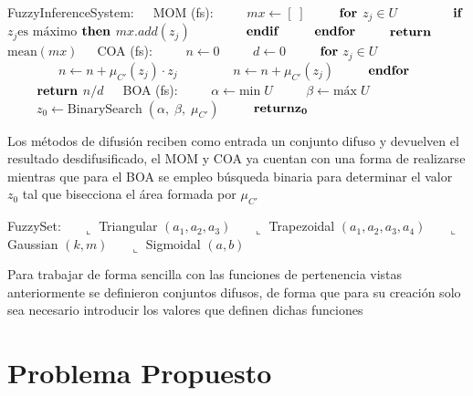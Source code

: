 \documentclass[a4paper,10pt,twocolumn]{article}
\begin{document}
\begin{algorithm}
	\begin{algorithmic}
		\STATE FuzzyInferenceSystem:
		\STATE $ \;\;\;$ MOM (fs):
		\STATE $ \qquad\; mx \leftarrow [\;]$ 
		\STATE $ \qquad\; \bf{for}$ $z_j \in U $
		\STATE $ \qquad\qquad \bf{if}$ $z_j \text{es m\'aximo}$ $\bf{then}$ $ mx.add(z_j)$
		\STATE $ \qquad\qquad \bf{endif}$
		\STATE $ \qquad\; \bf{endfor}$ 
		\STATE $ \qquad\; \bf{return}$ $\text{mean} (mx)$
		\STATE
		\STATE $ \;\;\;$ COA (fs):
		\STATE $ \qquad\; n \leftarrow 0$ 
		\STATE $ \qquad\; d \leftarrow 0$
		\STATE $ \qquad\; \bf{for}$ $z_j \in U $
		\STATE $ \qquad\qquad n \leftarrow n + \mu_{C'} (z_j) \cdot z_j$
		\STATE $ \qquad\qquad n \leftarrow n + \mu_{C'} (z_j)$
		\STATE $ \qquad\; \bf{endfor}$ 
		\STATE $ \qquad\; \bf{return}$ $ n / d$
		\STATE
		\STATE $ \;\;\;$ BOA (fs):
		\STATE $ \qquad\; \alpha \leftarrow \text{min} \;U$ 
		\STATE $ \qquad\; \beta \leftarrow \text{m\'ax} \;U$
		\STATE $ \qquad\; z_0 \leftarrow \text{BinarySearch} \;(\alpha,\; \beta,\; \mu_{C'})$
		\STATE $ \qquad\; \bf{return} z_0$
	\end{algorithmic}
\end{algorithm}

Los m\'etodos de difusi\'on reciben como entrada un conjunto difuso y devuelven el resultado desdifusificado, el MOM y COA ya cuentan con una forma de realizarse mientras que para el BOA se empleo b\'usqueda binaria para determinar el valor $z_0$ tal que bisecciona el \'area formada por $\mu_{C'}$

\begin{algorithm}
	\begin{algorithmic}
		\STATE FuzzySet:
		\STATE $\quad$ $\llcorner$ Triangular $(a_1, a_2, a_3)$
		\STATE $\quad$ $\llcorner$ Trapezoidal $(a_1, a_2, a_3, a_4)$
		\STATE $\quad$ $\llcorner$ Gaussian $(k, m)$
		\STATE $\quad$ $\llcorner$ Sigmoidal $(a, b)$
	\end{algorithmic}
\end{algorithm}

Para trabajar de forma sencilla con las funciones de pertenencia vistas anteriormente se definieron conjuntos difusos, de forma que para su creaci\'on solo sea necesario introducir los valores que definen dichas funciones 

\section*{Problema Propuesto}\label{sec:dev}
 
\end{document}
